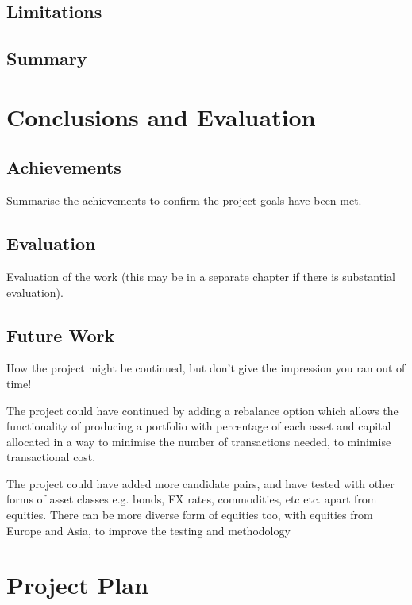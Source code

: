 \documentclass[a4paper]{report}
\begin{document}
\section{Limitations}

\section{Summary}

\chapter{Conclusions and Evaluation}
\label{chap:conclusions}
\section{Achievements}
Summarise the achievements to confirm the project goals have been met.
\section{Evaluation}
Evaluation of the work (this may be in a separate chapter if there is substantial evaluation).

\section{Future Work}
How the project might be continued, but don't give the impression you ran out of time!

The project could have continued by adding a rebalance option which allows the functionality of producing a portfolio with percentage of each asset and capital allocated in a way to minimise the number of transactions needed, to minimise transactional cost.

The project could have added more candidate pairs, and have tested with other forms of asset classes e.g. bonds, FX rates, commodities, etc etc. apart from equities. There can be more diverse form of equities too, with equities from Europe and Asia, to improve the testing and methodology

\appendix
{}

\printbibliography

\newpage
{}

\chapter{Project Plan}
\end{document}
